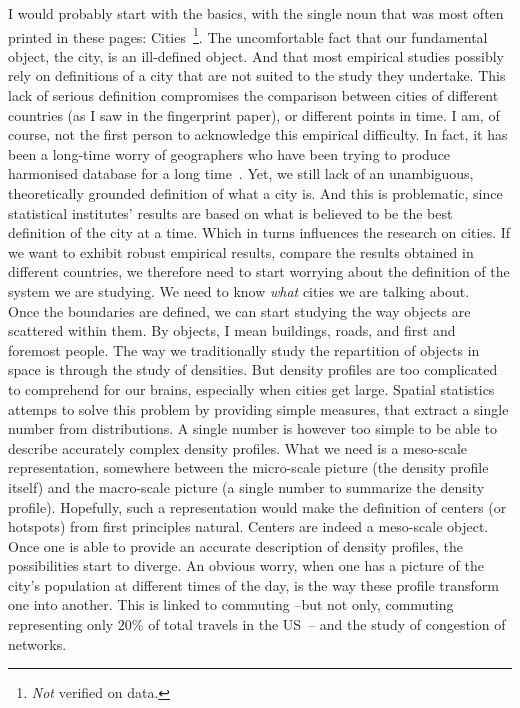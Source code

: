 I would probably start with the basics, with the single noun that was most often
printed in these pages: Cities~\footnote{\emph{Not} verified on data.}. The
uncomfortable fact that our fundamental object, the city, is an ill-defined
object. And that most empirical studies possibly rely on definitions of a city
that are not suited to the study they undertake.  This lack of serious
definition compromises the comparison between cities of different countries (as
I saw in the fingerprint paper), or different points in time. I am, of course,
not the first person to acknowledge this empirical difficulty. In fact, it has
been a long-time worry of geographers who have been trying to produce harmonised
database for a long time~\cite{Pumain:2015}. Yet, we still lack of an
unambiguous, theoretically grounded definition of what a city is. And this is
problematic, since statistical institutes' results are based on what is believed
to be the best definition of the city at a time. Which in turns influences the
research on cities. If we want to exhibit robust empirical results, compare the
results obtained in different countries, we therefore need to start worrying
about the definition of the system we are studying. We need to know \emph{what}
cities we are talking about.\\


Once the boundaries are defined, we can start studying the way objects are
scattered within them. By objects, I mean buildings, roads, and first and
foremost people. The way we traditionally study the repartition of objects in
space is through the study of densities. But density profiles are too
complicated to comprehend for our brains, especially when cities get large.
Spatial statistics attemps to solve this problem by providing simple measures,
that extract a single number from distributions. A single number is however too
simple to be able to describe accurately complex density profiles. What we need
is a meso-scale representation, somewhere between the micro-scale picture (the
density profile itself) and the macro-scale picture (a single number to
summarize the density profile). Hopefully, such a representation would make the
definition of centers (or hotspots) from first principles natural. Centers are
indeed a meso-scale object.\\


Once one is able to provide an accurate description of density profiles, the
possibilities start to diverge. An obvious worry, when one has a picture of the
city's population at different times of the day, is the way these profile
transform one into another. This is linked to commuting --but not only,
commuting representing only $20\%$ of total travels in the
US~\cite{FHWA-PL-11-022}-- and the study of congestion of networks. 


